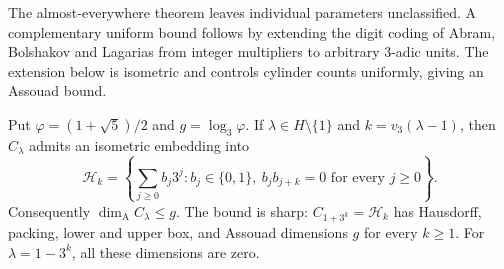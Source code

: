 The almost-everywhere theorem leaves individual parameters
unclassified. A complementary uniform bound follows by extending
the digit coding of Abram, Bolshakov and Lagarias
\cite[Theorem~6.2]{ABL} from integer multipliers to arbitrary
$3$-adic units. The extension below is isometric and controls
cylinder counts uniformly, giving an Assouad bound.

\begin{theorem}
\label{typical:golden-gap}
Put $\varphi=(1+\sqrt5)/2$ and $g=\log_3\varphi$.
If $\lambda\in H\setminus\{1\}$ and $k=v_3(\lambda-1)$, then
$C_\lambda$ admits an isometric embedding into
\[
 \mathcal H_k=\left\{\sum_{j\ge0}b_j3^j:
       b_j\in\{0,1\},\ b_jb_{j+k}=0\text{ for every }j\ge0\right\}.
\]
Consequently $\dim_{\mathrm A}C_\lambda\le g$. The bound is sharp:
$C_{1+3^k}=\mathcal H_k$ has Hausdorff, packing, lower and upper
box, and Assouad dimensions $g$ for every $k\ge1$.
For $\lambda=1-3^k$, all these dimensions are zero.
\end{theorem}

